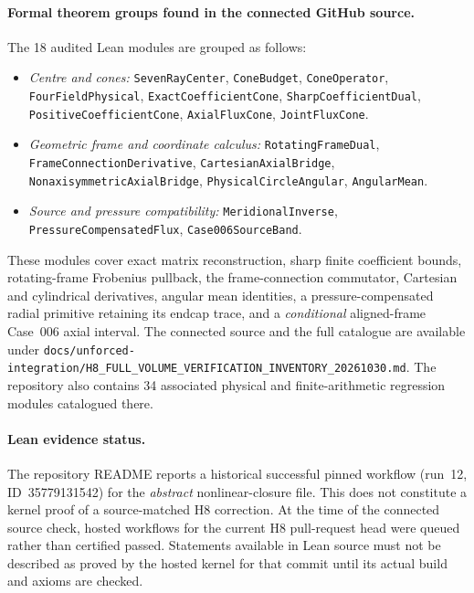 \paragraph{Formal theorem groups found in the connected GitHub source.}
The 18 audited Lean modules are grouped as follows:
\begin{itemize}
\item \emph{Centre and cones:} \texttt{SevenRayCenter}, \texttt{ConeBudget}, \texttt{ConeOperator}, \texttt{FourFieldPhysical}, \texttt{ExactCoefficientCone}, \texttt{SharpCoefficientDual}, \texttt{PositiveCoefficientCone}, \texttt{AxialFluxCone}, \texttt{JointFluxCone}.
\item \emph{Geometric frame and coordinate calculus:} \texttt{RotatingFrameDual}, \texttt{FrameConnectionDerivative}, \texttt{CartesianAxialBridge}, \texttt{NonaxisymmetricAxialBridge}, \texttt{PhysicalCircleAngular}, \texttt{AngularMean}.
\item \emph{Source and pressure compatibility:} \texttt{MeridionalInverse}, \texttt{PressureCompensatedFlux}, \texttt{Case006SourceBand}.
\end{itemize}
These modules cover exact matrix reconstruction, sharp finite coefficient bounds, rotating-frame Frobenius pullback, the frame-connection commutator, Cartesian and cylindrical derivatives, angular mean identities, a pressure-compensated radial primitive retaining its endcap trace, and a \emph{conditional} aligned-frame Case~006 axial interval. The connected source and the full catalogue are available under \texttt{docs/unforced-integration/H8\_FULL\_VOLUME\_VERIFICATION\_INVENTORY\_20261030.md}. The repository also contains 34 associated physical and finite-arithmetic regression modules catalogued there.

\paragraph{Lean evidence status.}
The repository README reports a historical successful pinned workflow (run~12, ID~35779131542) for the \emph{abstract} nonlinear-closure file. This does not constitute a kernel proof of a source-matched H8 correction. At the time of the connected source check, hosted workflows for the current H8 pull-request head were queued rather than certified passed. Statements available in Lean source must not be described as proved by the hosted kernel for that commit until its actual build and axioms are checked.

